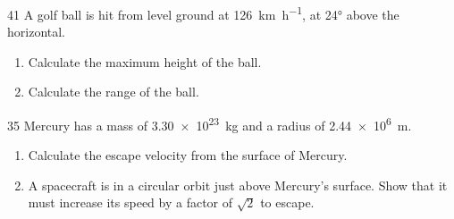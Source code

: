 \begin{practiceq}{4}{1}\label{pq:golf}
A golf ball is hit from level ground at \qty{126}{km.h^{-1}}, at \ang{24} above the
horizontal.
\begin{enumerate}[label=(\alph*)]
  \item Calculate the maximum height of the ball. 
  \item Calculate the range of the ball. 
\end{enumerate}
\end{practiceq}

\begin{practiceq}{3}{5}\label{pq:mercury}
Mercury has a mass of \qty{3.30e23}{kg} and a radius of \qty{2.44e6}{m}.
\begin{enumerate}[label=(\alph*)]
  \item Calculate the escape velocity from the surface of Mercury. 
  \item A spacecraft is in a circular orbit just above Mercury's surface. Show that it must
        increase its speed by a factor of $\sqrt{2}$ to escape. 
\end{enumerate}
\end{practiceq}

